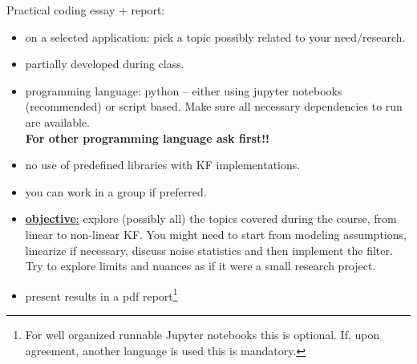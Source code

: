 {    Practical coding essay + report:
        \begin{itemize}
            \item on a selected application: pick a topic possibly related to
            your need/research.
            \item partially developed during class.
            \item programming language: python -- either using jupyter notebooks
            (recommended) or script based. Make sure all necessary dependencies
            to run are available.\\\textbf{For other programming language ask first!!}
            \item no use of predefined libraries with KF implementations.
            \item you can work in a group if preferred.
            \item \underline{\textbf{objective}:} explore (possibly all) the
            topics covered during the course, from linear to non-linear KF. You
            might need to start from modeling assumptions, linearize if
            necessary, discuss noise statistics and then implement the filter.
            Try to explore limits and nuances as if it were a small research
            project.
            \item present results in a pdf report\footnote{For well organized
            runnable Jupyter notebooks this is optional. If, upon agreement,
            another language is used this is mandatory.}
        \end{itemize}

}



